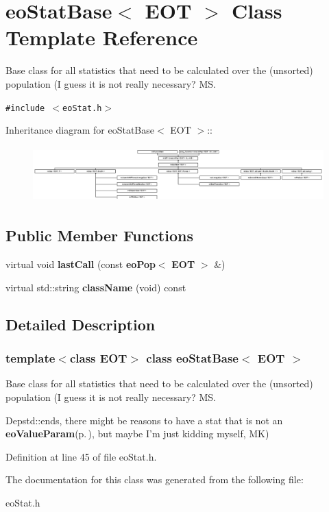 \section{eo\-Stat\-Base$<$ EOT $>$ Class Template Reference}
\label{classeo_stat_base}
Base class for all statistics that need to be calculated over the (unsorted) population (I guess it is not really necessary? MS.  


{\tt \#include $<$eo\-Stat.h$>$}

Inheritance diagram for eo\-Stat\-Base$<$ EOT $>$::\begin{figure}[H]
\begin{center}
\leavevmode
\includegraphics[height=2.16216cm]{classeo_stat_base}
\end{center}
\end{figure}
\subsection*{Public Member Functions}
\begin{CompactItemize}
\item 
virtual void {\bf last\-Call} (const {\bf eo\-Pop}$<$ {\bf EOT} $>$ \&)\label{classeo_stat_base_a0}

\item 
virtual std::string {\bf class\-Name} (void) const \label{classeo_stat_base_a1}

\end{CompactItemize}


\subsection{Detailed Description}
\subsubsection*{template$<$class EOT$>$ class eo\-Stat\-Base$<$ EOT $>$}

Base class for all statistics that need to be calculated over the (unsorted) population (I guess it is not really necessary? MS. 

Depstd::ends, there might be reasons to have a stat that is not an {\bf eo\-Value\-Param}{\rm (p.\,\pageref{classeo_value_param})}, but maybe I'm just kidding myself, MK) 



Definition at line 45 of file eo\-Stat.h.

The documentation for this class was generated from the following file:\begin{CompactItemize}
\item 
eo\-Stat.h\end{CompactItemize}
